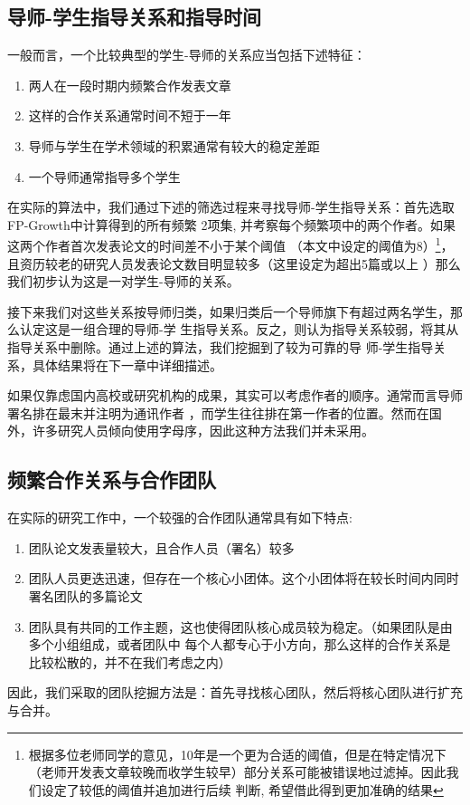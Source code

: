 \documentclass[a4paper]{article}
\begin{document}
\subsection{导师-学生指导关系和指导时间}
一般而言，一个比较典型的学生-导师的关系应当包括下述特征：
\begin{enumerate}
  \item 两人在一段时期内频繁合作发表文章
  \item 这样的合作关系通常时间不短于一年
  \item 导师与学生在学术领域的积累通常有较大的稳定差距
  \item 一个导师通常指导多个学生
\end{enumerate}

在实际的算法中，我们通过下述的筛选过程来寻找导师-学生指导关系：首先选取FP-Growth中计算得到的所有频繁
2项集, 并考察每个频繁项中的两个作者。如果这两个作者首次发表论文的时间差不小于某个阈值
（本文中设定的阈值为8）\footnote{根据多位老师同学的意见，10年是一个更为合适的阈值，但是在特定情况下
（老师开发表文章较晚而收学生较早）部分关系可能被错误地过滤掉。因此我们设定了较低的阈值并追加进行后续
判断, 希望借此得到更加准确的结果}，且资历较老的研究人员发表论文数目明显较多（这里设定为超出5篇或以上
）那么我们初步认为这是一对学生-导师的关系。

接下来我们对这些关系按导师归类，如果归类后一个导师旗下有超过两名学生，那么认定这是一组合理的导师-学
生指导关系。反之，则认为指导关系较弱，将其从指导关系中删除。通过上述的算法，我们挖掘到了较为可靠的导
师-学生指导关系，具体结果将在下一章中详细描述。

如果仅靠虑国内高校或研究机构的成果，其实可以考虑作者的顺序。通常而言导师署名排在最末并注明为通讯作者
，而学生往往排在第一作者的位置。然而在国外，许多研究人员倾向使用字母序，因此这种方法我们并未采用。

\subsection{频繁合作关系与合作团队}
在实际的研究工作中，一个较强的合作团队通常具有如下特点:
\begin{enumerate}
  \item 团队论文发表量较大，且合作人员（署名）较多
  \item 团队人员更迭迅速，但存在一个核心小团体。这个小团体将在较长时间内同时署名团队的多篇论文
  \item 团队具有共同的工作主题，这也使得团队核心成员较为稳定。（如果团队是由多个小组组成，或者团队中
    每个人都专心于小方向，那么这样的合作关系是比较松散的，并不在我们考虑之内）
\end{enumerate}
因此，我们采取的团队挖掘方法是：首先寻找核心团队，然后将核心团队进行扩充与合并。
\end{document}
